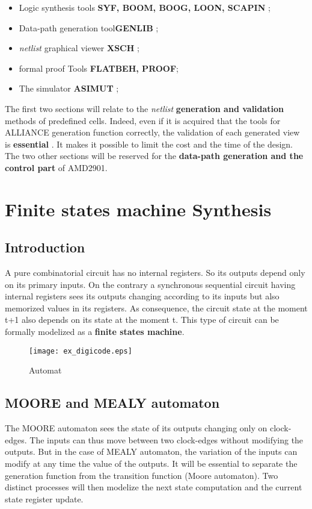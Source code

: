 \documentclass[12pt]{article}
\begin{document}
{\begin{itemize}\itemsep=-.8ex
\item   Logic synthesis tools { \bf SYF, BOOM, BOOG, LOON, SCAPIN };
\item   Data-path generation tool{\bf GENLIB };
\item   { \it netlist } graphical viewer  { \bf XSCH };
\item   formal proof Tools {\bf FLATBEH, PROOF};
\item   The simulator { \bf ASIMUT };
\end{itemize}

The first two sections will relate to the { \it netlist } { \bf
generation and validation } methods of predefined cells. Indeed,
even if it is acquired that the tools for ALLIANCE generation
function correctly, the validation of each generated view is { \bf
essential }. It makes it possible to limit
the cost and the time of the design.  \\
The two other sections will be reserved for the { \bf data-path
generation and the control part } of AMD2901.

\section{Finite states machine Synthesis}

\subsection{Introduction}

A pure combinatorial circuit has no internal registers. So
its outputs depend only on its primary inputs. On the contrary 
a synchronous sequential circuit having internal registers sees its
outputs changing according to its inputs but also memorized values
in its registers. As consequence, the circuit state at the moment
t+1 also depends on its state at the moment t. This type of
circuit can be formally modelized as a { \bf finite states machine}.

\begin{figure}[H]\centering
  \texttt{[image: ex\_digicode.eps]}
 \caption{Automat}
  \label{Fig:ex_digicode}
\end{figure}

\subsection{MOORE and MEALY automaton}
The MOORE automaton sees the state of its outputs changing only on
clock-edges. The inputs can thus move between two clock-edges
without modifying the outputs. But in the case of MEALY automaton,
the variation of the inputs can modify at any time the value of
the outputs. It will be essential to separate the generation
function from the transition function (Moore automaton).
Two distinct processes will then modelize the next state computation
and the current state register update.

}
\end{document}
